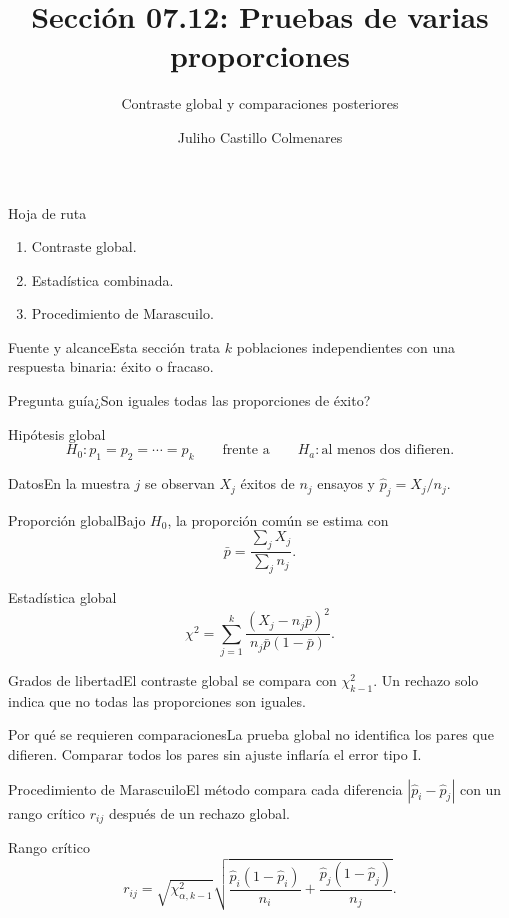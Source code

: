 \documentclass[10pt,aspectratio=169]{beamer}
\title[Varias proporciones]{Sección 07.12: Pruebas de varias proporciones}\subtitle{Contraste global y comparaciones posteriores}
\author[J. Castillo Colmenares]{Juliho Castillo Colmenares}\institute{Tecnológico de Monterrey}\date{}
\begin{document}
\begin{frame}[plain]\titlepage\end{frame}
\begin{frame}{Hoja de ruta}\small\begin{enumerate}\item Contraste global.\item Estadística combinada.\item Procedimiento de Marascuilo.\end{enumerate}\end{frame}
\begin{frame}{Fuente y alcance}\small Esta sección trata $k$ poblaciones independientes con una respuesta binaria: éxito o fracaso.\begin{block}{Pregunta guía}¿Son iguales todas las proporciones de éxito?\end{block}\end{frame}
\begin{frame}{Hipótesis global}\small\[H_0:p_1=p_2=\cdots=p_k\qquad\text{frente a}\qquad H_a:\text{al menos dos difieren}.\]\end{frame}
\begin{frame}{Datos}\small En la muestra $j$ se observan $X_j$ éxitos de $n_j$ ensayos y $\hat p_j=X_j/n_j$.\end{frame}
\begin{frame}{Proporción global}\small Bajo $H_0$, la proporción común se estima con\[\bar p=\frac{\sum_jX_j}{\sum_jn_j}.\]\end{frame}
\begin{frame}{Estadística global}\small\[\chi^2=\sum_{j=1}^{k}\frac{(X_j-n_j\bar p)^2}{n_j\bar p(1-\bar p)}.\]\end{frame}
\begin{frame}{Grados de libertad}\small El contraste global se compara con $\chi^2_{k-1}$. Un rechazo solo indica que no todas las proporciones son iguales.\end{frame}
\begin{frame}{Por qué se requieren comparaciones}\small La prueba global no identifica los pares que difieren. Comparar todos los pares sin ajuste inflaría el error tipo I.\end{frame}
\begin{frame}{Procedimiento de Marascuilo}\small El método compara cada diferencia $|\hat p_i-\hat p_j|$ con un rango crítico $r_{ij}$ después de un rechazo global.\end{frame}
\begin{frame}{Rango crítico}\small\[r_{ij}=\sqrt{\chi^2_{\alpha,k-1}}\sqrt{\frac{\hat p_i(1-\hat p_i)}{n_i}+\frac{\hat p_j(1-\hat p_j)}{n_j}}.\]\end{frame}
\end{document}
